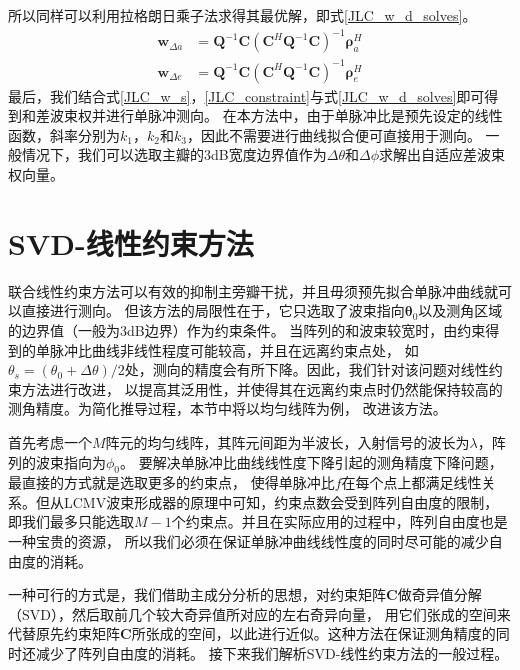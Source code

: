 \documentclass[master]{thesis-uestc}
\begin{document}
所以同样可以利用拉格朗日乘子法求得其最优解，即式\eqref{JLC_w_d_solves}。
\begin{subequations}\label{JLC_w_d_solves}
    \begin{align}
        \bm{w}_{\Delta a} &= \bm{Q}^{-1}\bm{C}\left(\bm{C}^H\bm{Q}^{-1}\bm{C}\right)^{-1}\bm{\rho}^H_a \\
        \bm{w}_{\Delta e} &= \bm{Q}^{-1}\bm{C}\left(\bm{C}^H\bm{Q}^{-1}\bm{C}\right)^{-1}\bm{\rho}^H_e
    \end{align}
\end{subequations}
最后，我们结合式\eqref{JLC_w_s}，\eqref{JLC_constraint}与式\eqref{JLC_w_d_solves}即可得到和差波束权并进行单脉冲测向。
在本方法中，由于单脉冲比是预先设定的线性函数，斜率分别为$k_1$，$k_2$和$k_3$，因此不需要进行曲线拟合便可直接用于测向。
一般情况下，我们可以选取主瓣的3dB宽度边界值作为$\Delta\theta$和$\Delta\phi$求解出自适应差波束权向量。

\section{SVD-线性约束方法}
联合线性约束方法可以有效的抑制主旁瓣干扰，并且毋须预先拟合单脉冲曲线就可以直接进行测向。
但该方法的局限性在于，它只选取了波束指向$\bm{\theta}_0$以及测角区域的边界值（一般为3dB边界）作为约束条件。
当阵列的和波束较宽时，由约束得到的单脉冲比曲线非线性程度可能较高，并且在远离约束点处，
如$\theta_s=(\theta_0+\Delta\theta)/2$处，测向的精度会有所下降。因此，我们针对该问题对线性约束方法进行改进，
以提高其泛用性，并使得其在远离约束点时仍然能保持较高的测角精度。为简化推导过程，本节中将以均匀线阵为例，
改进该方法。

首先考虑一个$M$阵元的均匀线阵，其阵元间距为半波长，入射信号的波长为$\lambda$，阵列的波束指向为$\phi_0$。
要解决单脉冲比曲线线性度下降引起的测角精度下降问题，最直接的方式就是选取更多的约束点，
使得单脉冲比$f$在每个点上都满足线性关系。但从LCMV波束形成器的原理中可知，约束点数会受到阵列自由度的限制，
即我们最多只能选取$M-1$个约束点。并且在实际应用的过程中，阵列自由度也是一种宝贵的资源，
所以我们必须在保证单脉冲曲线线性度的同时尽可能的减少自由度的消耗。

一种可行的方式是，我们借助主成分分析的思想，对约束矩阵$\bm{C}$做奇异值分解（SVD），然后取前几个较大奇异值所对应的左右奇异向量，
用它们张成的空间来代替原先约束矩阵$\bm{C}$所张成的空间，以此进行近似。这种方法在保证测角精度的同时还减少了阵列自由度的消耗。
接下来我们解析SVD-线性约束方法的一般过程。
\end{document}
